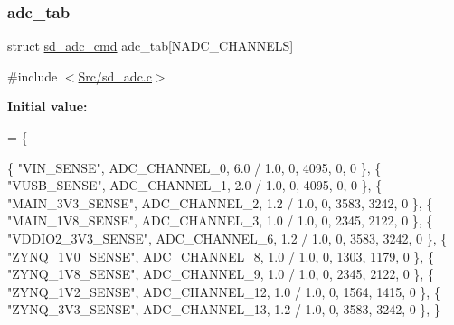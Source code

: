 \subsubsection{\texorpdfstring{adc\+\_\+tab}{adc\_tab}}
{\footnotesize\ttfamily struct \mbox{\hyperlink{structsd__adc__cmd}{sd\+\_\+adc\+\_\+cmd}} adc\+\_\+tab\mbox{[}N\+A\+D\+C\+\_\+\+C\+H\+A\+N\+N\+E\+LS\mbox{]}\hspace{0.3cm}{\ttfamily [static]}}



{\ttfamily \#include $<$\mbox{\hyperlink{sd__adc_8c}{Src/sd\+\_\+adc.\+c}}$>$}

{\bfseries Initial value\+:}
\begin{DoxyCode}
= \{
    
    \{ \textcolor{stringliteral}{"VIN\_SENSE"},      ADC\_CHANNEL\_0,  6.0 / 1.0,  0,  4095,   0,  0   \},
    \{ \textcolor{stringliteral}{"VUSB\_SENSE"},     ADC\_CHANNEL\_1,  2.0 / 1.0,  0,  4095,   0,  0   \},
    \{ \textcolor{stringliteral}{"MAIN\_3V3\_SENSE"}, ADC\_CHANNEL\_2,  1.2 / 1.0,  0,  3583,   3242,   0   \},
    \{ \textcolor{stringliteral}{"MAIN\_1V8\_SENSE"}, ADC\_CHANNEL\_3,  1.0 / 1.0,  0,  2345,   2122,   0   \},
    \{ \textcolor{stringliteral}{"VDDIO2\_3V3\_SENSE"},   ADC\_CHANNEL\_6,  1.2 / 1.0,  0,  3583,   3242,   0   \},
    \{ \textcolor{stringliteral}{"ZYNQ\_1V0\_SENSE"}, ADC\_CHANNEL\_8,  1.0 / 1.0,  0,  1303,   1179,   0   \},
    \{ \textcolor{stringliteral}{"ZYNQ\_1V8\_SENSE"}, ADC\_CHANNEL\_9,  1.0 / 1.0,  0,  2345,   2122,   0   \},
    \{ \textcolor{stringliteral}{"ZYNQ\_1V2\_SENSE"}, ADC\_CHANNEL\_12, 1.0 / 1.0,  0,  1564,   1415,   0   \},
    \{ \textcolor{stringliteral}{"ZYNQ\_3V3\_SENSE"}, ADC\_CHANNEL\_13, 1.2 / 1.0,  0,  3583,   3242,   0   \},
\}
\end{DoxyCode}
